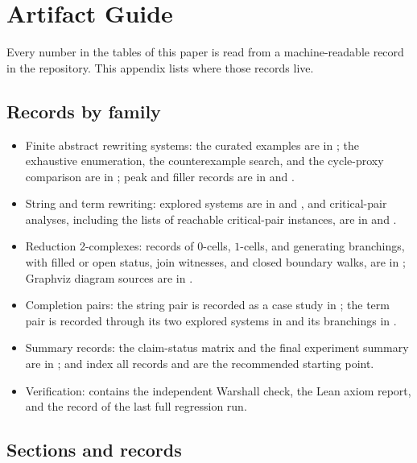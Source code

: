 \section{Artifact Guide}
\label{app:artifact-guide}

Every number in the tables of this paper is read from a machine-readable record in the repository. This appendix lists where those records live.

\subsection{Records by family}

\begin{itemize}
    \item Finite abstract rewriting systems: the curated examples are in ; the exhaustive enumeration, the counterexample search, and the cycle-proxy comparison are in ; peak and filler records are in  and .
    \item String and term rewriting: explored systems are in  and , and critical-pair analyses, including the lists of reachable critical-pair instances, are in  and .
    \item Reduction 2-complexes: records of $0$-cells, $1$-cells, and generating branchings, with filled or open status, join witnesses, and closed boundary walks, are in ; Graphviz diagram sources are in .
    \item Completion pairs: the string pair is recorded as a case study in ; the term pair is recorded through its two explored systems in  and its branchings in .
    \item Summary records: the claim-status matrix and the final experiment summary are in ;  and  index all records and are the recommended starting point.
    \item Verification:  contains the independent Warshall check, the Lean axiom report, and the record of the last full regression run.
\end{itemize}

\subsection{Sections and records}

